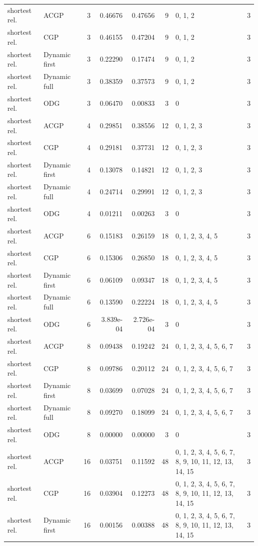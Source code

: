 \documentclass[10pt,a4paper]{article}
\begin{document}
\begin{longtable}{@{}p{23mm}p{29mm}rrrrp{36mm}r@{}}
shortest rel. & ACGP & 3 & 0.46676 & 0.47656 & 9 & 0, 1, 2 & 3 \\
shortest rel. & CGP & 3 & 0.46155 & 0.47204 & 9 & 0, 1, 2 & 3 \\
shortest rel. & Dynamic first & 3 & 0.22290 & 0.17474 & 9 & 0, 1, 2 & 3 \\
shortest rel. & Dynamic full & 3 & 0.38359 & 0.37573 & 9 & 0, 1, 2 & 3 \\
shortest rel. & ODG & 3 & 0.06470 & 0.00833 & 3 & 0 & 3 \\
shortest rel. & ACGP & 4 & 0.29851 & 0.38556 & 12 & 0, 1, 2, 3 & 3 \\
shortest rel. & CGP & 4 & 0.29181 & 0.37731 & 12 & 0, 1, 2, 3 & 3 \\
shortest rel. & Dynamic first & 4 & 0.13078 & 0.14821 & 12 & 0, 1, 2, 3 & 3 \\
shortest rel. & Dynamic full & 4 & 0.24714 & 0.29991 & 12 & 0, 1, 2, 3 & 3 \\
shortest rel. & ODG & 4 & 0.01211 & 0.00263 & 3 & 0 & 3 \\
shortest rel. & ACGP & 6 & 0.15183 & 0.26159 & 18 & 0, 1, 2, 3, 4, 5 & 3 \\
shortest rel. & CGP & 6 & 0.15306 & 0.26850 & 18 & 0, 1, 2, 3, 4, 5 & 3 \\
shortest rel. & Dynamic first & 6 & 0.06109 & 0.09347 & 18 & 0, 1, 2, 3, 4, 5 & 3 \\
shortest rel. & Dynamic full & 6 & 0.13590 & 0.22224 & 18 & 0, 1, 2, 3, 4, 5 & 3 \\
shortest rel. & ODG & 6 & 3.839e-04 & 2.726e-04 & 3 & 0 & 3 \\
shortest rel. & ACGP & 8 & 0.09438 & 0.19242 & 24 & 0, 1, 2, 3, 4, 5, 6, 7 & 3 \\
shortest rel. & CGP & 8 & 0.09786 & 0.20112 & 24 & 0, 1, 2, 3, 4, 5, 6, 7 & 3 \\
shortest rel. & Dynamic first & 8 & 0.03699 & 0.07028 & 24 & 0, 1, 2, 3, 4, 5, 6, 7 & 3 \\
shortest rel. & Dynamic full & 8 & 0.09270 & 0.18099 & 24 & 0, 1, 2, 3, 4, 5, 6, 7 & 3 \\
shortest rel. & ODG & 8 & 0.00000 & 0.00000 & 3 & 0 & 3 \\
shortest rel. & ACGP & 16 & 0.03751 & 0.11592 & 48 & 0, 1, 2, 3, 4, 5, 6, 7, 8, 9, 10, 11, 12, 13, 14, 15 & 3 \\
shortest rel. & CGP & 16 & 0.03904 & 0.12273 & 48 & 0, 1, 2, 3, 4, 5, 6, 7, 8, 9, 10, 11, 12, 13, 14, 15 & 3 \\
shortest rel. & Dynamic first & 16 & 0.00156 & 0.00388 & 48 & 0, 1, 2, 3, 4, 5, 6, 7, 8, 9, 10, 11, 12, 13, 14, 15 & 3 \\

\end{longtable}
\end{document}
